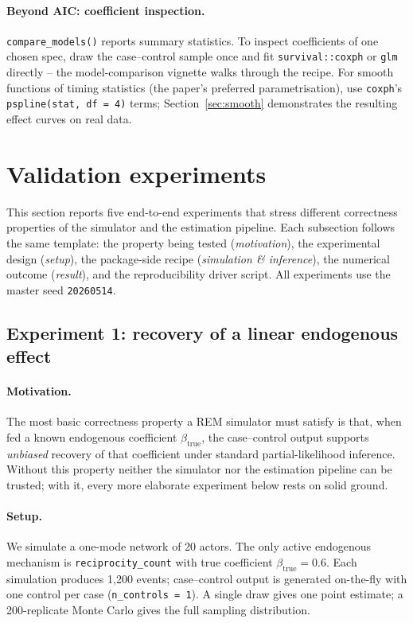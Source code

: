 \documentclass[11pt,a4paper]{article}
\begin{document}
\paragraph{Beyond AIC: coefficient inspection.}
\texttt{compare\_models()} reports summary statistics. To inspect
coefficients of one chosen spec, draw the case--control sample
once and fit \texttt{survival::coxph} or \texttt{glm} directly --
the model-comparison vignette walks through the recipe. For
smooth functions of timing statistics (the paper's preferred
parametrisation), use \texttt{coxph}'s
\texttt{pspline(stat, df = 4)} terms;
Section~\ref{sec:smooth} demonstrates the resulting effect
curves on real data.

\section{Validation experiments}\label{sec:validation}

This section reports five end-to-end experiments that stress
different correctness properties of the simulator and the
estimation pipeline. Each subsection follows the same template:
the property being tested (\emph{motivation}), the experimental
design (\emph{setup}), the package-side recipe
(\emph{simulation \& inference}), the numerical outcome
(\emph{result}), and the reproducibility driver script. All
experiments use the master seed \texttt{20260514}.

\subsection{Experiment 1: recovery of a linear endogenous effect}
\label{sec:exp1}

\paragraph{Motivation.}
The most basic correctness property a REM simulator must satisfy
is that, when fed a known endogenous coefficient
$\beta_{\text{true}}$, the case--control output supports
\emph{unbiased} recovery of that coefficient under standard
partial-likelihood inference. Without this property neither the
simulator nor the estimation pipeline can be trusted; with it,
every more elaborate experiment below rests on solid ground.

\paragraph{Setup.}
We simulate a one-mode network of 20 actors. The only active
endogenous mechanism is \texttt{reciprocity\_count} with true
coefficient $\beta_{\text{true}} = 0.6$. Each simulation produces
1{,}200 events; case--control output is generated on-the-fly
with one control per case (\texttt{n\_controls = 1}). A single
draw gives one point estimate; a 200-replicate Monte Carlo gives
the full sampling distribution.
\end{document}
